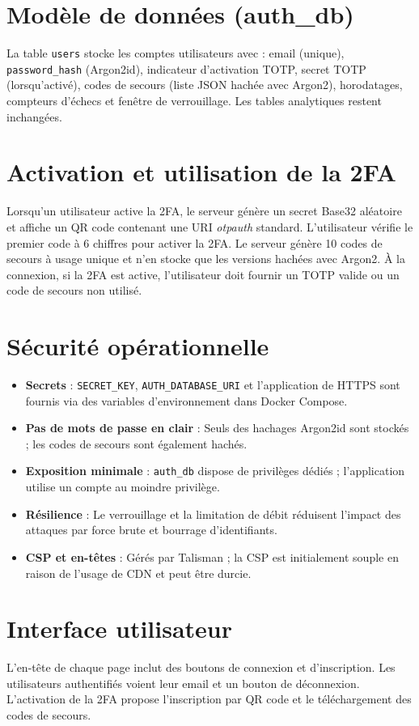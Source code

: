 \section{Modèle de données (auth\_db)}
La table \texttt{users} stocke les comptes utilisateurs avec : email (unique), \texttt{password\_hash} (Argon2id), indicateur d'activation TOTP, secret TOTP (lorsqu'activé), codes de secours (liste JSON hachée avec Argon2), horodatages, compteurs d'échecs et fenêtre de verrouillage. Les tables analytiques restent inchangées.

\section{Activation et utilisation de la 2FA}
Lorsqu'un utilisateur active la 2FA, le serveur génère un secret Base32 aléatoire et affiche un QR code contenant une URI \textit{otpauth} standard. L'utilisateur vérifie le premier code à 6 chiffres pour activer la 2FA. Le serveur génère 10 codes de secours à usage unique et n'en stocke que les versions hachées avec Argon2. À la connexion, si la 2FA est active, l'utilisateur doit fournir un TOTP valide ou un code de secours non utilisé.

\section{Sécurité opérationnelle}
\begin{itemize}
  \item \textbf{Secrets} : \texttt{SECRET\_KEY}, \texttt{AUTH\_DATABASE\_URI} et l'application de HTTPS sont fournis via des variables d'environnement dans Docker Compose.
  \item \textbf{Pas de mots de passe en clair} : Seuls des hachages Argon2id sont stockés ; les codes de secours sont également hachés.
  \item \textbf{Exposition minimale} : \texttt{auth\_db} dispose de privilèges dédiés ; l'application utilise un compte au moindre privilège.
  \item \textbf{Résilience} : Le verrouillage et la limitation de débit réduisent l'impact des attaques par force brute et bourrage d'identifiants.
  \item \textbf{CSP et en-têtes} : Gérés par Talisman ; la CSP est initialement souple en raison de l'usage de CDN et peut être durcie.
\end{itemize}

\section{Interface utilisateur}
L'en-tête de chaque page inclut des boutons de connexion et d'inscription. Les utilisateurs authentifiés voient leur email et un bouton de déconnexion. L'activation de la 2FA propose l'inscription par QR code et le téléchargement des codes de secours.

